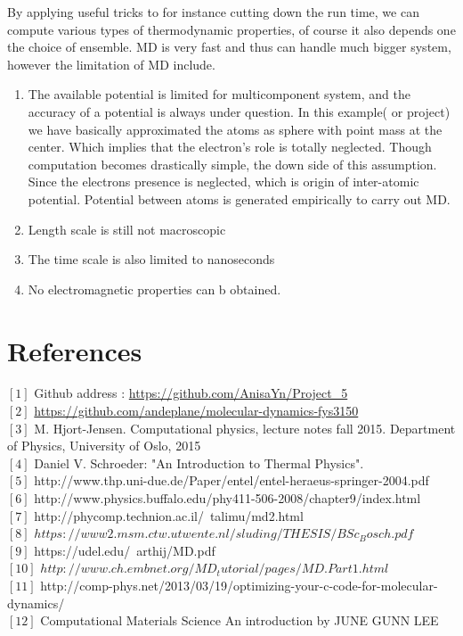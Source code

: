\documentclass[a4paper]{article}
\begin{document}
By applying useful tricks to for instance cutting down the run time, we can compute various types of thermodynamic properties, of course it also depends one the choice of ensemble. MD is very fast and thus can handle much bigger system, however the limitation of MD include. 
\begin{enumerate}
\item The available potential is limited for multicomponent system, and the accuracy of a potential is always under question. In this example( or project) we have basically approximated the atoms as sphere with point mass at the center. Which implies that the electron's role is totally neglected. Though computation becomes drastically simple, the down side of this assumption. Since the electrons presence is neglected, which is origin of inter-atomic potential. Potential between atoms is generated empirically to carry out MD. 
\item Length scale is still not macroscopic
\item The time scale is also limited to nanoseconds
\item No electromagnetic properties can b obtained. 

\end{enumerate}
\newpage
\section{References}

\noindent $[1]$ Github address : \url {https://github.com/AnisaYn/Project_5} \\
\noindent $[2]$ \url {https://github.com/andeplane/molecular-dynamics-fys3150}
\\ $[3]$ M. Hjort-Jensen. Computational physics, lecture notes fall 2015. Department of Physics, University of Oslo, 2015
\\ $[4]$ Daniel V. Schroeder: "An Introduction to Thermal Physics".
\\ $[5]$ http://www.thp.uni-due.de/Paper/entel/entel-heraeus-springer-2004.pdf
\\ $[6]$ http://www.physics.buffalo.edu/phy411-506-2008/chapter9/index.html
\\ $[7]$ http://phycomp.technion.ac.il/~talimu/md2.html
\\ $[8]$ $https://www2.msm.ctw.utwente.nl/sluding/THESIS/BSc_Bosch.pdf$
\\ $[9]$ https://udel.edu/~arthij/MD.pdf
\\ $[10]$ $http://www.ch.embnet.org/MD_tutorial/pages/MD.Part1.html$
\\ $[11]$ http://comp-phys.net/2013/03/19/optimizing-your-c-code-for-molecular-dynamics/
\\ $[12]$ Computational Materials Science An introduction by JUNE GUNN LEE
\end{document}
